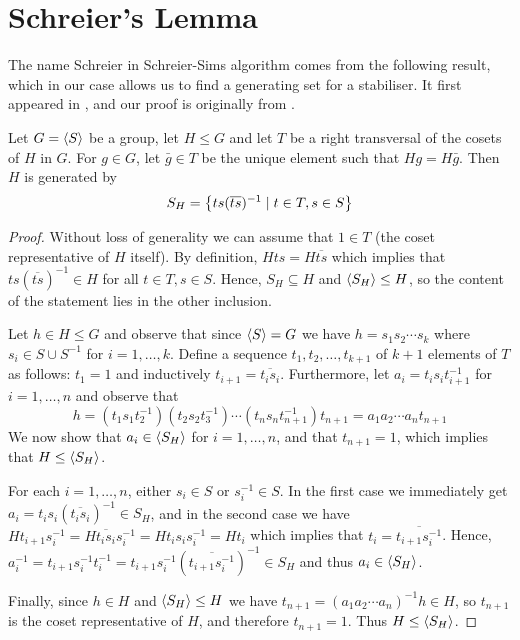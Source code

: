 \section{Schreier's Lemma}
The name Schreier in Schreier-Sims algorithm comes from the following
result, which in our case allows us to find a generating set for a stabiliser. It
first appeared in \cite{schreier27}, and our proof is originally from \cite{hall59}.
\begin{theorem} \label{schreiers_lemma}
Let $G = \left\langle S \right\rangle$ be a group, let $H \leq G$ and let $T$ be a right transversal of the cosets of $H$ in $G$. For $g \in G$, let $\bar{g} \in T$ be the unique element such that $Hg = H\bar{g}$. Then $H$ is generated by
\begin{equation}
S_H = \left\lbrace t s (\overline{ts})^{-1} \mid t \in T, s \in S \right\rbrace
\end{equation}
\end{theorem}
\begin{proof}
  Without loss of generality we can assume that $1 \in T$ (the coset
  representative of $H$ itself). By definition, $Hts = H\overline{ts}$
  which implies that $t s (\overline{ts})^{-1} \in H$ for all $t \in
  T, s \in S$. Hence, $S_H \subseteq H$ and $\left\langle S_H \right\rangle \leq H$, so the
  content of the statement lies in the other inclusion.
  
  Let $h \in H \leq G$ and observe that since $\left\langle S \right\rangle = G$ we have $h
  = s_1 s_2 \dotsm s_k$ where $s_i \in S \cup S^{-1}$ for $i = 1,
  \dotsc, k$. Define a sequence $t_1, t_2, \dotsc, t_{k + 1}$ of $k +
  1$ elements of $T$ as follows: $t_1 = 1$ and inductively $t_{i + 1} = \overline{t_i s_i}$. Furthermore, let $a_i = t_i s_i t_{i + 1}^{-1}$ for $i = 1, \dotsc, n$ and observe that
\begin{equation}
h = (t_1 s_1 t_2^{-1})(t_2 s_2 t_3^{-1}) \dotsm (t_n s_n t_{n + 1}^{-1}) t_{n + 1} = a_1 a_2 \dotsm a_n t_{n + 1}
\end{equation}
We now show that $a_i \in \left\langle S_H \right\rangle$ for $i = 1, \dotsc, n$, and that $t_{n + 1} = 1$, which
implies that $H \leq \left\langle S_H \right\rangle$. 

For each $i = 1, \dotsc, n$, either $s_i \in S$ or $s_i^{-1} \in S$.
In the first case we immediately get $a_i = t_i s_i (\overline{t_i
  s_i})^{-1} \in S_H$, and in the second case we have $H t_{i + 1}
s_i^{-1} = H \overline{t_i s_i} s_i^{-1} = H t_i s_i s_i^{-1} = H t_i$
which implies that $t_i = \overline{t_{i + 1} s_i^{-1}}$. Hence,
$a_i^{-1} = t_{i + 1} s_i^{-1} t_i^{-1} = t_{i + 1} s_i^{-1}
\left(\overline{t_{i + 1} s_i^{-1}}\right)^{-1} \in S_H$ and thus $a_i \in \left\langle S_H \right\rangle$.

Finally, since $h \in H$ and $\left\langle S_H \right\rangle \leq H$ we have $t_{n + 1} = (a_1 a_2 \dotsm a_n)^{-1} h \in H$, so $t_{n + 1}$ is the coset representative of $H$, and therefore $t_{n + 1} = 1$. Thus $H \leq \left\langle S_H \right\rangle$.
\end{proof}

